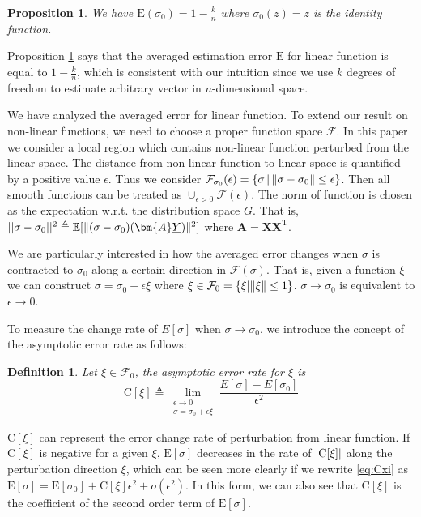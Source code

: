 \documentclass[conference]{IEEEtran}
\newtheorem{definition}{Definition}
\newtheorem{proposition}{Proposition}
\DeclarePairedDelimiter\abs{\lvert}{\rvert}
\DeclarePairedDelimiter\norm{\lVert}{\rVert}
\def\E{\mathbb{E}}
\def\T{\mathrm{T}}
\begin{document}
\begin{proposition}\label{prop:linear}
We have $\mathrm{E}(\sigma_0) = 1 - \frac{k}{n}$ where $\sigma_0(z) = z$ is the identity function.
\end{proposition}

Proposition \ref{prop:linear} says that the averaged estimation error $\mathrm{E}$ for linear function is equal to $1-\frac{k}{n}$,
which is consistent with our intuition
since we use $k$ degrees of freedom to estimate arbitrary vector in $n$-dimensional space.



We have analyzed the averaged error for linear function.
To extend our result on non-linear functions, we need to choose a proper function space $\mathcal{F}$.
In this paper we consider a local region which contains non-linear function perturbed from the linear space.
The distance from non-linear function to linear space is quantified by a positive value $\epsilon$.
Thus we consider $\mathcal{F}_{\sigma_0}(\epsilon) =\{ \sigma \,|\, \norm{\sigma - \sigma_0} \leq \epsilon\}$.
Then all smooth functions can be treated as $\cup_{\epsilon>0} \mathcal{F}(\epsilon)$.
The norm of function is chosen as the expectation w.r.t. the distribution space $G$.
That is, $||\sigma - \sigma_0||^2\triangleq \E[\norm{(\sigma - \sigma_0)(\bm{A}\underline{Y})}^2] $
where $\bm{A} = \bm{X}\bm{X}^\T$.


We are particularly interested in how the averaged error changes
when $\sigma$ is contracted to $\sigma_0$ along a certain direction in $\mathcal{F}(\sigma)$.
That is, given a function $\xi$ we can construct $\sigma = \sigma_0 + \epsilon \xi$
where $\xi \in \mathcal{F}_0 = \{\xi | \norm{\xi} \leq 1 \}$. $\sigma \to \sigma_0$ is equivalent to $\epsilon \to 0$.

To measure the change rate of $E[\sigma]$ when $\sigma \to \sigma_0$,
we introduce the concept of the asymptotic error rate as follows:
\begin{definition}
Let $\xi \in \mathcal{F}_0$, the asymptotic error rate for $\xi$ is
\begin{equation}\label{eq:Cxi}
\mathrm{C}[\xi] \triangleq \lim_{\substack{\epsilon \to 0 \\ \sigma = \sigma_0 + \epsilon \xi}} \frac{E[\sigma] - E[\sigma_0]}{\epsilon^2}
\end{equation}
\end{definition}

$\mathrm{C}[\xi]$ can represent the error change rate of perturbation from linear function.
If $\mathrm{C}[\xi]$ is negative for a given $\xi$,
$\mathrm{E}[\sigma]$ decreases in the rate of $\abs{\mathrm{C}[\xi]}$ along the perturbation direction $\xi$,
which can be seen more clearly if we rewrite \eqref{eq:Cxi} as
$\mathrm{E}[\sigma] = \mathrm{E}[\sigma_0] +
\mathrm{C}[\xi]\epsilon^2 + o(\epsilon^2)$.
In this form, we can also see that $\mathrm{C}[\xi]$ is the coefficient of the second order term of $\mathrm{E}[\sigma]$.
\end{document}
